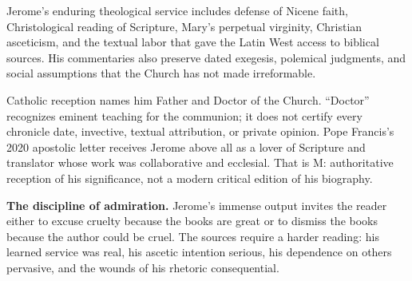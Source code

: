 Jerome's enduring theological service includes defense of Nicene faith,
Christological reading of Scripture, Mary's perpetual virginity, Christian
asceticism, and the textual labor that gave the Latin West access to biblical
sources. His commentaries also preserve dated exegesis, polemical judgments,
and social assumptions that the Church has not made irreformable.

Catholic reception names him Father and Doctor of the Church. ``Doctor''
recognizes eminent teaching for the communion; it does not certify every
chronicle date, invective, textual attribution, or private opinion.
Pope Francis's 2020 apostolic letter receives Jerome above all as a lover of
Scripture and translator whose work was collaborative and ecclesial. That is M:
authoritative reception of his significance, not a modern critical edition of
his biography.

\begin{studyframe}
\textbf{The discipline of admiration.} Jerome's immense output invites the
reader either to excuse cruelty because the books are great or to dismiss the
books because the author could be cruel. The sources require a harder reading:
his learned service was real, his ascetic intention serious, his dependence on
others pervasive, and the wounds of his rhetoric consequential.
\end{studyframe}
